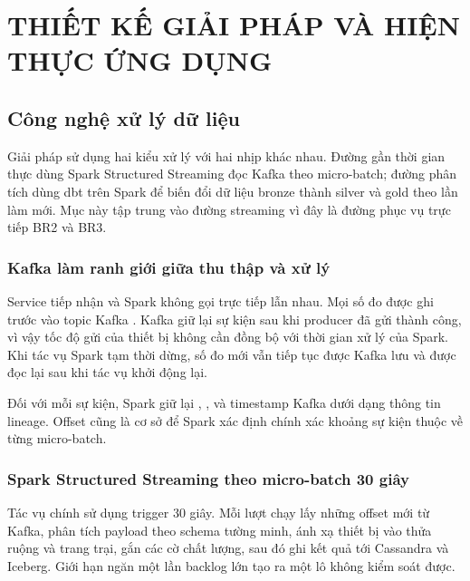 \chapter{THIẾT KẾ GIẢI PHÁP VÀ HIỆN THỰC ỨNG DỤNG}
\label{chap:4-design}





\section{Công nghệ xử lý dữ liệu}
\label{sec:4-processing}

Giải pháp sử dụng hai kiểu xử lý với hai nhịp khác nhau. Đường gần thời gian thực dùng Spark Structured Streaming đọc Kafka theo micro-batch; đường phân tích dùng dbt trên Spark để biến đổi dữ liệu bronze thành silver và gold theo lần làm mới. Mục này tập trung vào đường streaming vì đây là đường phục vụ trực tiếp BR2 và BR3.

\subsection{Kafka làm ranh giới giữa thu thập và xử lý}

Service tiếp nhận và Spark không gọi trực tiếp lẫn nhau. Mọi số đo được ghi trước vào topic Kafka . Kafka giữ lại sự kiện sau khi producer đã gửi thành công, vì vậy tốc độ gửi của thiết bị không cần đồng bộ với thời gian xử lý của Spark. Khi tác vụ Spark tạm thời dừng, số đo mới vẫn tiếp tục được Kafka lưu và được đọc lại sau khi tác vụ khởi động lại.

Đối với mỗi sự kiện, Spark giữ lại , ,  và timestamp Kafka dưới dạng thông tin lineage. Offset cũng là cơ sở để Spark xác định chính xác khoảng sự kiện thuộc về từng micro-batch.

\subsection{Spark Structured Streaming theo micro-batch 30 giây}

Tác vụ chính sử dụng trigger 30 giây. Mỗi lượt chạy lấy những offset mới từ Kafka, phân tích payload theo schema tường minh, ánh xạ thiết bị vào thửa ruộng và trang trại, gắn các cờ chất lượng, sau đó ghi kết quả tới Cassandra và Iceberg. Giới hạn  ngăn một lần backlog lớn tạo ra một lô không kiểm soát được.

